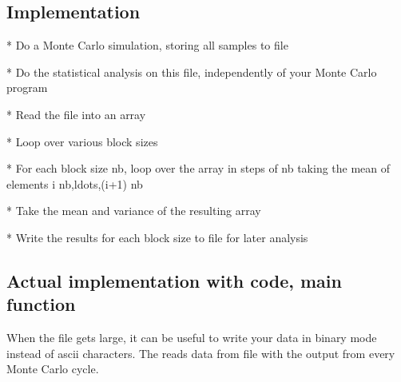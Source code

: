 \documentclass[letterpaper,10pt,english]{sphinxmanual}
\begin{document}
\subsection{Implementation}
\label{\detokenize{chapter3:implementation}}
\begin{sphinxVerbatim}[commandchars=\\\{\}]
* Do a Monte Carlo simulation, storing all samples to file

* Do the statistical analysis on this file, independently of your Monte Carlo program

* Read the file into an array

* Loop over various block sizes

* For each block size \PYGZdl{}n\PYGZus{}b\PYGZdl{}, loop over the array in steps of \PYGZdl{}n\PYGZus{}b\PYGZdl{} taking the mean of elements \PYGZdl{}i n\PYGZus{}b,\PYGZbs{}ldots,(i+1) n\PYGZus{}b\PYGZdl{}

* Take the mean and variance of the resulting array

* Write the results for each block size to file for later
  analysis
\end{sphinxVerbatim}


\subsection{Actual implementation with code, main function}
\label{\detokenize{chapter3:actual-implementation-with-code-main-function}}
When the file gets large, it can be useful to write your data in binary mode instead of ascii characters.
The    reads data from file with the output from every Monte Carlo cycle.
\end{document}
